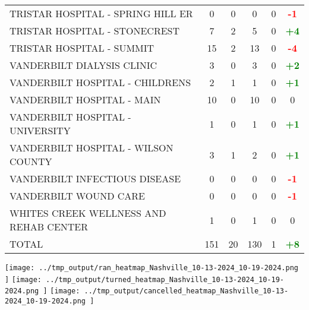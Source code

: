 \documentclass{article}
\begin{document}
\begin{longtable}{l|cccc|c}
    
        TRISTAR HOSPITAL - SPRING HILL ER & 0 & 0 & 0 & 0 & \textcolor{red}{\textbf{-1}} \\
    

    
        TRISTAR HOSPITAL - STONECREST & 7 & 2 & 5 & 0 & \textcolor{green}{\textbf{+4}} \\
    

    
        TRISTAR HOSPITAL - SUMMIT & 15 & 2 & 13 & 0 & \textcolor{red}{\textbf{-4}} \\
    

    
        VANDERBILT DIALYSIS CLINIC & 3 & 0 & 3 & 0 & \textcolor{green}{\textbf{+2}} \\
    

    
        VANDERBILT HOSPITAL - CHILDRENS & 2 & 1 & 1 & 0 & \textcolor{green}{\textbf{+1}} \\
    

    
        VANDERBILT HOSPITAL - MAIN & 10 & 0 & 10 & 0 & 0 \\
    

    
        VANDERBILT HOSPITAL - UNIVERSITY & 1 & 0 & 1 & 0 & \textcolor{green}{\textbf{+1}} \\
    

    
        VANDERBILT HOSPITAL - WILSON COUNTY & 3 & 1 & 2 & 0 & \textcolor{green}{\textbf{+1}} \\
    

    
        VANDERBILT INFECTIOUS DISEASE & 0 & 0 & 0 & 0 & \textcolor{red}{\textbf{-1}} \\
    

    
        VANDERBILT WOUND CARE & 0 & 0 & 0 & 0 & \textcolor{red}{\textbf{-1}} \\
    

    
        WHITES CREEK WELLNESS AND REHAB CENTER & 1 & 0 & 1 & 0 & 0 \\
    

    
        \hline
    

    
        TOTAL & 151 & 20 & 130 & 1 & \textcolor{green}{\textbf{+8}} \\
    

\bottomrule
\end{longtable}

\clearpage

\texttt{[image:  ../tmp\_output/ran\_heatmap\_Nashville\_10-13-2024\_10-19-2024.png ]}
\texttt{[image:  ../tmp\_output/turned\_heatmap\_Nashville\_10-13-2024\_10-19-2024.png ]}
\texttt{[image:  ../tmp\_output/cancelled\_heatmap\_Nashville\_10-13-2024\_10-19-2024.png ]}
\end{document}
